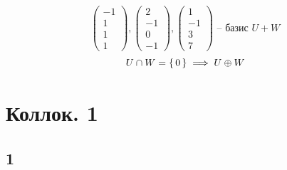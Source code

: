 \begin{itemize}
$$\begin{pmatrix}
        -1 \\
        1 \\
        1 \\
        1
    \end{pmatrix},
    \begin{pmatrix}
        2 \\
        -1 \\
        0 \\
        -1
    \end{pmatrix},
    \begin{pmatrix}
        1 \\
        -1 \\
        3 \\
        7
    \end{pmatrix} \text{ -- базис } U + W $$
    $$ U \cap W = \set{0} \implies U \oplus W $$
\end{itemize}

\chapter{Коллок. 1}

\section{1}

